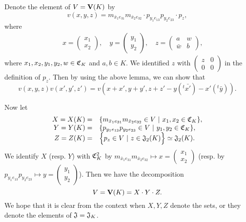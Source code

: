 \documentclass[11pt]{amsart}
\numberwithin{equation}{section}
\theoremstyle{definition}
\begin{document}
Denote the element of $V=\bold V(K)$ by 
$$v(x,y,z)=m_{\bar x_1e_{31}}m_{\bar x_2e_{32}}\cdot p_{y_1 e_{13}} p_{y_2 e_{23}}\cdot p_{z},$$ 
where 
\begin{eqnarray*}
&&x=\begin{pmatrix} x_1\\ x_2\end{pmatrix}, \quad y=\begin{pmatrix} y_1\\y_2\end{pmatrix},\quad z=\begin{pmatrix} a& w\\ \bar w&b\end{pmatrix},
\end{eqnarray*}
where $x_1,x_2,y_1,y_2,w\in \frak C_K$ and $a,b\in K$. We identified $z$ with $\begin{pmatrix} z&0\\0&0\end{pmatrix}$ in the definition of $p_z$.
Then by using the above lemma, we can show that
\begin{equation}\label{mult}
v(x,y,z)v(x',y',z')=v(x+x', y+y', z+z'- y ({}^t \bar{x'})-{x'}({}^t \bar y)).
\end{equation}

Now let 
\begin{equation}\label{xyz}
\begin{array}{rl}
X=X(K)=&\{ m_{\bar x_1e_{31}}m_{\bar x_2e_{32}} \in V\ |\ x_1,x_2\in \frak C_K  \},\\
 Y=Y(K)=&\{ p_{y_1 e_{13}} p_{y_2 e_{23}}\in V\ |\ y_1,y_2\in \frak C_K  \},\\
 Z=Z(K)=&\Big\{ p_z\in V \ |\  z\in \frak J_2(K)  \Big\}\simeq \frak J_2(K).
\end{array}
\end{equation}
We identify $X$ (resp. $Y$) with $\frak C^2_K$ by $m_{\bar x_1e_{31}}m_{\bar x_2e_{32}}\mapsto x=\begin{pmatrix} x_1\\ x_2\end{pmatrix}$ 
(resp. by $p_{y_1 e_{13}} p_{y_2 e_{23}}\mapsto y=\begin{pmatrix} y_1\\ y_2\end{pmatrix}$).  
Then we have the decomposition 
\begin{equation}\label{v}
V=\bold V(K)=X\cdot Y\cdot Z.
\end{equation}
We hope that it is clear from the context when $X,Y,Z$ denote the sets, or they denote the elements of $\frak J=\frak J_K$. 
\end{document}
